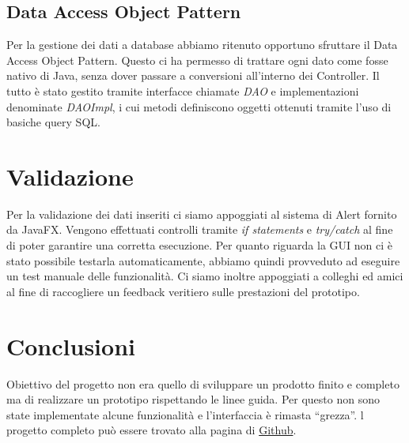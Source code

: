 \documentclass[a4paper, 11pt]{article}
\begin{document}
		\subsection{Data Access Object Pattern}
		Per la gestione dei dati a database abbiamo ritenuto opportuno sfruttare il Data Access Object Pattern. Questo ci ha permesso di trattare ogni dato come fosse nativo di Java, senza dover passare a conversioni all'interno dei Controller. Il tutto è stato gestito tramite interfacce chiamate \textit{DAO} e implementazioni denominate \textit{DAOImpl}, i cui metodi definiscono oggetti ottenuti tramite l'uso di basiche query SQL.
		
		\section{Validazione}
		Per la validazione dei dati inseriti ci siamo appoggiati al sistema di Alert fornito da JavaFX. Vengono effettuati controlli tramite \textit{if statements} e \textit{try/catch} al fine di poter garantire una corretta esecuzione.\newline
		Per quanto riguarda la GUI non ci è stato possibile testarla automaticamente, abbiamo quindi provveduto ad eseguire un test manuale delle funzionalità. Ci siamo inoltre appoggiati a colleghi ed amici al fine di raccogliere un feedback veritiero sulle prestazioni del prototipo.
		
		\section{Conclusioni}
		Obiettivo del progetto non era quello di sviluppare un prodotto finito e completo ma di realizzare un prototipo rispettando le linee guida. Per questo non sono state implementate alcune funzionalità e l'interfaccia è rimasta ``grezza''. 
		l progetto completo può essere trovato alla pagina di \href{https://github.com/zetaemme/drug-supervision}{Github}. 
		
\end{document}
